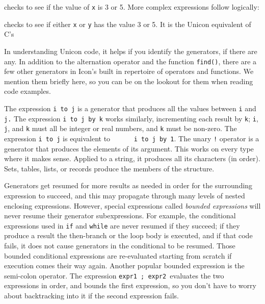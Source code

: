 
\noindent
checks to see if the value of \texttt{x} is 3 or 5. More complex
expressions follow logically:


\noindent
checks to see if either \texttt{x} or \texttt{y} has the value 3 or
5. It is the Unicon equivalent of C's


In understanding Unicon code, it helps if you identify the
generators, if there are any. In addition to the alternation operator
\texttt{{\textbar}} and the function \texttt{find()}, there are a few
other generators in Icon's built in repertoire of
operators and functions. We mention them briefly here, so you can be on
the lookout for them when reading code examples.

The expression \texttt{i }\texttt{to j} is a
generator that produces all the values between \texttt{i} and
\texttt{j.} The expression \texttt{i to j }\texttt{by k} works similarly, incrementing each result by
\texttt{k}; \texttt{i}, \texttt{j}, and \texttt{k} must all be integer
or real numbers, and \texttt{k} must be non-zero. The expression
\texttt{i to j} is equivalent to \ \ \ \ \ \ \texttt{i to j by 1}. The
unary \texttt{!} operator is a generator
that produces the elements of its argument. This works on every type
where it makes sense. Applied to a string, it produces all its
characters (in order). Sets, tables, lists, or records produce the
members of the structure.

Generators get resumed for more results as needed in order for the
surrounding expression to succeed, and this may propagate through many
levels of nested enclosing expressions. However, special expressions
called \textit{bounded expressions} will
never resume their generator subexpressions. For example, the
conditional expressions used in \texttt{if} and \texttt{while} are
never resumed if they succeed; if they produce a result the then-branch
or the loop body is executed, and if that code fails, it does not cause
generators in the conditional to be resumed. Those bounded conditional
expressions are re-evaluated starting from scratch if execution comes
their way again. Another popular bounded expression is the semi-colon
operator. The expression \texttt{expr1 ; expr2 }evaluates the two
expressions in order, and bounds the first expression, so you
don't have to worry about backtracking into it if the
second expression fails.

